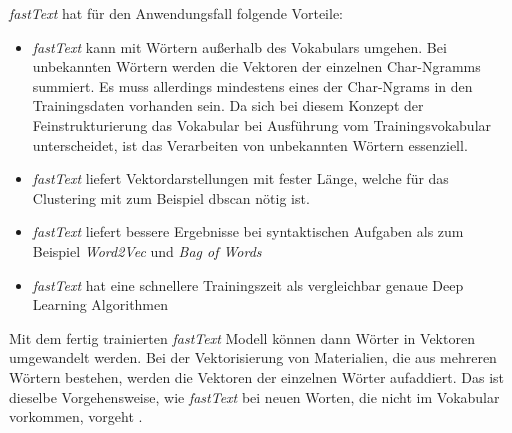 \textit{fastText} hat für den Anwendungsfall folgende Vorteile:

\begin{itemize}
	\item \textit{fastText} kann mit Wörtern außerhalb des Vokabulars umgehen. Bei unbekannten Wörtern werden die Vektoren der einzelnen Char-Ngramms summiert. Es muss allerdings mindestens eines der Char-Ngrams in den Trainingsdaten vorhanden sein. \citep[vgl.][]{gensim_fastText,le2014distributed} Da sich bei diesem Konzept der Feinstrukturierung das Vokabular bei Ausführung vom Trainingsvokabular unterscheidet, ist das Verarbeiten von unbekannten Wörtern essenziell.
	\item \textit{fastText} liefert Vektordarstellungen mit fester Länge, welche für das Clustering mit zum Beispiel \ac{dbscan} nötig ist. \citep[vgl.][]{le2014distributed}
	\item \textit{fastText} liefert bessere Ergebnisse bei syntaktischen Aufgaben als zum Beispiel \textit{Word2Vec} und \textit{Bag of Words} \citep[vgl.][]{fastText_word2vec_comparison,le2014distributed}
	\item \textit{fastText} hat eine schnellere Trainingszeit als vergleichbar genaue Deep Learning Algorithmen \citep[vgl.][]{fastText_release2016}
\end{itemize}


Mit dem fertig trainierten \textit{fastText} Modell können dann Wörter in Vektoren umgewandelt werden. Bei der Vektorisierung von Materialien, die aus mehreren Wörtern bestehen, werden die Vektoren der einzelnen Wörter aufaddiert. Das ist dieselbe Vorgehensweise, wie \textit{fastText} bei neuen Worten, die nicht im Vokabular vorkommen, vorgeht \citep[vgl.][]{gensim_fastText}.


